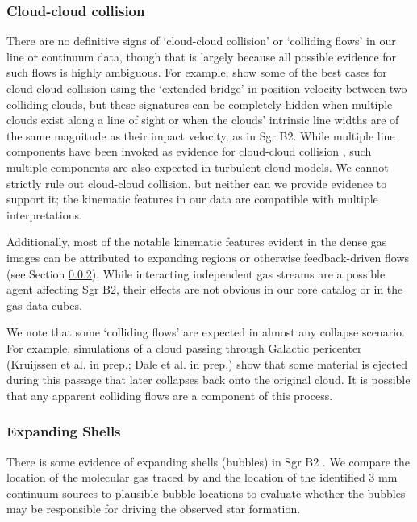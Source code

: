\documentclass[twocolumn]{aastex61}
\begin{document}
\subsubsection{Cloud-cloud collision}
There are no definitive signs of `cloud-cloud collision' or `colliding flows'
in our line or continuum data, though that is largely because all possible
evidence for such flows is highly ambiguous. For example, \citet{Haworth2015c}
show some of the best cases for cloud-cloud collision using the `extended bridge'
in position-velocity between two colliding clouds, but these signatures can be 
completely hidden when multiple clouds exist along a line of sight or when
the clouds' intrinsic line widths are of the same magnitude as their impact velocity,
as in Sgr B2.  While multiple line components have been invoked as evidence
for cloud-cloud collision \citep{Hasegawa1994a,Corby2015a}, such multiple
components are also expected in turbulent cloud models.
We cannot strictly rule out cloud-cloud collision, but neither
can we provide evidence to support it; the kinematic features in our data are
compatible with multiple interpretations.

Additionally, most of the notable kinematic features evident in the dense gas
images can be attributed to expanding \hii regions or otherwise feedback-driven
flows (see Section \ref{sec:expandingshells}).  While interacting independent
gas streams are a possible agent affecting Sgr B2, their effects are not
obvious in our core catalog or in the gas data cubes.

We note that some `colliding flows' are expected in almost any collapse
scenario.  For example, simulations of a cloud passing through Galactic
pericenter (Kruijssen et al. in prep.; Dale et al. in prep.) show that some
material is ejected during this passage that later collapses back onto the
original cloud.  It is possible that any apparent colliding flows
\citep[e.g.][]{Sato2000a} are a component of this process.

\subsubsection{Expanding Shells}
\label{sec:expandingshells}
There is some evidence of expanding shells (bubbles) in Sgr B2
\citep{de-Vicente1997a,Martin-Pintado1999a}.  We compare the location of the
molecular gas traced by \cyanoacetylene and the location of the identified 3 mm
continuum sources to plausible bubble locations to evaluate whether the bubbles
may be responsible for driving the observed star formation.
\end{document}
